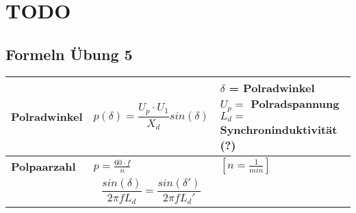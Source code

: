 \section{TODO}

\subsection{Formeln Übung 5}
\begin{tabular}[b]{|C{4cm}| P{8cm} | P{5cm}|}
    \hline
    \textbf{Polradwinkel}&
    \[ p(\delta)=\frac{U_p \cdot U_1}{X_d} sin(\delta) \]&
    $ \delta$ = Polradwinkel \newline
    $ U_p = $ Polradspannung \newline
    $ L_d =$ Synchroninduktivität (?)
    \\ \hline
    
    \textbf{Polpaarzahl}&
    $ p=\frac{60 \cdot f}{n} $&
    $ \left[n= \frac{1}{min}\right] $
    \\ \hline
    
    &
    \[  \frac{sin(\delta)}{2\pi f L_d}=\frac{sin(\delta ')}{2\pi f L_d '} \] &
    \\ \hline       
\end{tabular}
\clearpage
\pagebreak
